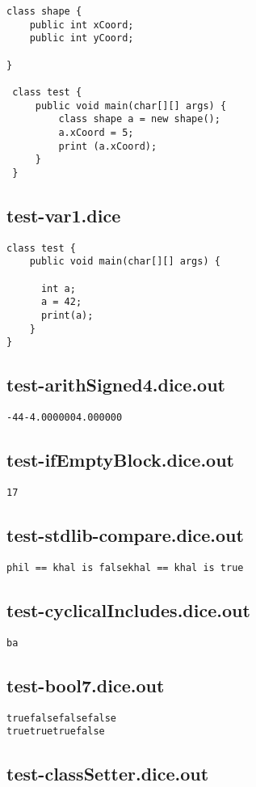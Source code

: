 \begin{verbatim}
class shape {
	public int xCoord;
	public int yCoord;
	
}

 class test {
	 public void main(char[][] args) {
		 class shape a = new shape();
		 a.xCoord = 5;
		 print (a.xCoord);
	 }
 }
\end{verbatim}\pagebreak\subsection{test-var1.dice}
\begin{verbatim}
class test {
	public void main(char[][] args) {

	  int a;
	  a = 42;
	  print(a);
	}
}

\end{verbatim}\pagebreak\subsection{test-arithSigned4.dice.out}
\begin{verbatim}
-44-4.0000004.000000
\end{verbatim}\pagebreak\subsection{test-ifEmptyBlock.dice.out}
\begin{verbatim}
17
\end{verbatim}\pagebreak\subsection{test-stdlib-compare.dice.out}
\begin{verbatim}
phil == khal is falsekhal == khal is true
\end{verbatim}\pagebreak\subsection{test-cyclicalIncludes.dice.out}
\begin{verbatim}
ba
\end{verbatim}\pagebreak\subsection{test-bool7.dice.out}
\begin{verbatim}
truefalsefalsefalse
truetruetruefalse
\end{verbatim}\pagebreak\subsection{test-classSetter.dice.out}
